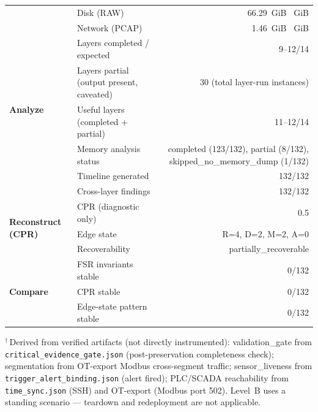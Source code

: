 \begin{table}[ht]
\begin{tabular}{llr}
 & Disk (RAW) & 66.29~GiB \pm 12.32~GiB \\
 & Network (PCAP) & 1.46~GiB \pm 1.26~GiB \\
\hline
\multirow{5}{*}{\textbf{Analyze}} & Layers completed / expected & 9--12/14 \\
 & Layers partial (output present, caveated) & 30 (total layer-run instances) \\
 & Useful layers (completed + partial) & 11--12/14 \\
 & Memory analysis status & completed (123/132), partial (8/132), skipped_no_memory_dump (1/132) \\
 & Timeline generated & 132/132 \\
 & Cross-layer findings & 132/132 \\
\hline
\multirow{3}{*}{\textbf{Reconstruct (CPR)}} & CPR (diagnostic only) & 0.5 \\
 & Edge state & R=4, D=2, M=2, A=0 \\
 & Recoverability & partially_recoverable \\
\hline
\multirow{3}{*}{\textbf{Compare}} & FSR invariants stable & 0/132 \\
 & CPR stable & 0/132 \\
 & Edge-state pattern stable & 0/132 \\
\hline
\end{tabular}
\begin{flushleft}
\footnotesize $^{\dagger}$\,Derived from verified artifacts (not directly instrumented):
validation\_gate from \texttt{critical\_evidence\_gate.json} (post-preservation completeness check);
segmentation from OT-export Modbus cross-segment traffic;
sensor\_liveness from \texttt{trigger\_alert\_binding.json} (alert fired);
PLC/SCADA reachability from \texttt{time\_sync.json} (SSH) and OT-export (Modbus port 502).
Level~B uses a standing scenario --- teardown and redeployment are not applicable.
\end{flushleft}
\end{table}
